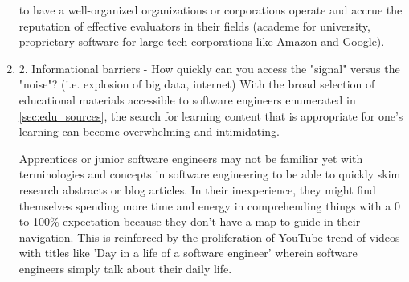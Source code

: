 \documentclass[journal, onecolumn]{IEEEtran}
\begin{document}
\begin{enumerate}
  to have a well-organized organizations or corporations operate and accrue the 
  reputation of effective evaluators in their fields (academe for university,
  proprietary software for large tech corporations like Amazon and Google).
  \item 2. Informational barriers - How quickly can you access the "signal" versus the "noise"? (i.e. explosion of big data, internet)
  With the broad selection of educational materials 
  accessible to software engineers enumerated in \ref{sec:edu_sources}, 
  the search for learning content that is appropriate for one's learning 
  can become overwhelming and intimidating. 
  
  Apprentices or junior software engineers may not be familiar yet with terminologies
  and concepts in software engineering to be able to quickly skim research abstracts or
  blog articles. In their inexperience, they might find themselves spending more time and
  energy in comprehending things with a 0 to 100\% expectation because they don't have a map to guide in 
  their navigation. This is reinforced by the proliferation of YouTube trend
  of videos with titles like 'Day in a life of a  software engineer' wherein
  software engineers simply talk about their daily life.
  

\end{enumerate}
\end{document}
